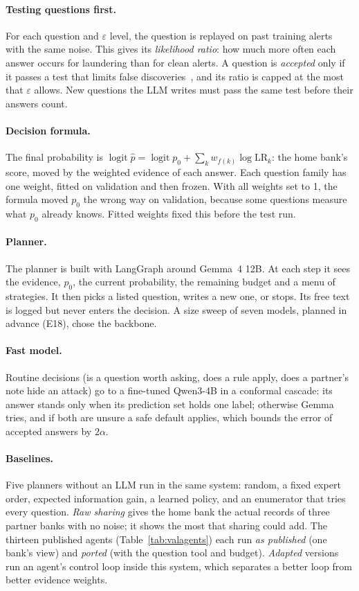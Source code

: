 \documentclass[11pt,a4paper]{article}
\newcommand{\eps}{\varepsilon}
\begin{document}
\paragraph{Testing questions first.} For each question and $\eps$ level, the question is replayed on past training alerts with the same noise. This gives its \emph{likelihood ratio}: how much more often each answer occurs for laundering than for clean alerts. A question is \emph{accepted} only if it passes a test that limits false discoveries~\cite{wang2022}, and its ratio is capped at the most that $\eps$ allows. New questions the LLM writes must pass the same test before their answers count.

\paragraph{Decision formula.} The final probability is $\operatorname{logit}\hat p = \operatorname{logit} p_0 + \sum_k w_{f(k)} \log \mathrm{LR}_k$: the home bank's score, moved by the weighted evidence of each answer. Each question family has one weight, fitted on validation and then frozen. With all weights set to 1, the formula moved $p_0$ the wrong way on validation, because some questions measure what $p_0$ already knows. Fitted weights fixed this before the test run.

\paragraph{Planner.} The planner is built with LangGraph around Gemma~4 12B. At each step it sees the evidence, $p_0$, the current probability, the remaining budget and a menu of strategies. It then picks a listed question, writes a new one, or stops. Its free text is logged but never enters the decision. A size sweep of seven models, planned in advance (E18), chose the backbone.

\paragraph{Fast model.} Routine decisions (is a question worth asking, does a rule apply, does a partner's note hide an attack) go to a fine-tuned Qwen3-4B in a conformal cascade: its answer stands only when its prediction set holds one label; otherwise Gemma tries, and if both are unsure a safe default applies, which bounds the error of accepted answers by $2\alpha$.

\paragraph{Baselines.} Five planners without an LLM run in the same system: random, a fixed expert order, expected information gain, a learned policy, and an enumerator that tries every question. \emph{Raw sharing} gives the home bank the actual records of three partner banks with no noise; it shows the most that sharing could add. The thirteen published agents (Table~\ref{tab:valagents}) each run \emph{as published} (one bank's view) and \emph{ported} (with the question tool and budget). \emph{Adapted} versions run an agent's control loop inside this system, which separates a better loop from better evidence weights.
\end{document}
